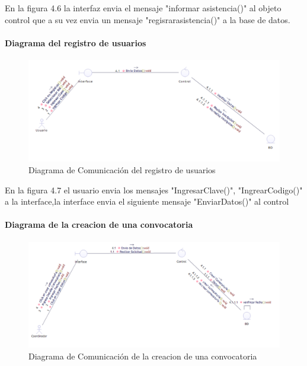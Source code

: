 En la figura 4.6 la interfaz envia el mensaje "informar asistencia()" al objeto control que a su vez envia un mensaje "regisrarasistencia()" a la base de datos.


\newpage

\paragraph{Diagrama del registro de usuarios}
\begin{figure}[H]
	\centering
	\includegraphics[width=1\linewidth]{parte2/imgs/DiagramaComunicacion/ComReguU}
	\caption[Diagrama de Comunicacion del registro de usuarios]{Diagrama de Comunicación del registro de usuarios}
	\label{fig:diagramaDeComunicacion3}
\end{figure}

En la figura 4.7 el usuario envia los mensajes "IngresarClave()", "IngrearCodigo()" a la interface,la interface envia el siguiente mensaje "EnviarDatos()"  al control 

\paragraph{Diagrama de la creacion de una convocatoria}
\begin{figure}[H]
	\centering
	\includegraphics[width=1\linewidth]{parte2/imgs/DiagramaComunicacion/ComCreConv}
	\caption[Diagrama de Comunicacion cfracion Covoactoria]{Diagrama de Comunicación de la creacion de una convocatoria}
	\label{fig:diagramaDeComunicacion5}
\end{figure}

